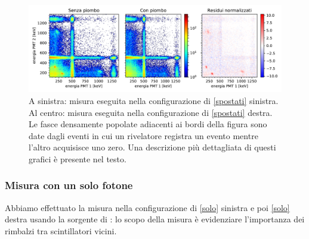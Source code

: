 \begin{figure}[h]
	\hspace{-0.25\textwidth}
	\includegraphics[width=1.5\textwidth]{immagini/diff}
	\caption{A sinistra: misura eseguita nella configurazione di \autoref{spostati} sinistra. \\
	Al centro: misura eseguita nella configurazione di \autoref{spostati} destra.  \\
	Le fasce densamente popolate adiacenti ai bordi della figura sono date dagli eventi in cui un rivelatore registra un evento mentre l'altro acquisisce uno zero.
	Una descrizione più dettagliata di questi grafici è presente nel testo.}
	\label{spostato}
\end{figure}

\subsubsection{Misura con un solo fotone}

Abbiamo effettuato la misura nella configurazione di \autoref{solo} sinistra e poi \autoref{solo} destra usando la sorgente di \cs{}: lo scopo della misura è evidenziare l'importanza dei rimbalzi tra scintillatori vicini.

